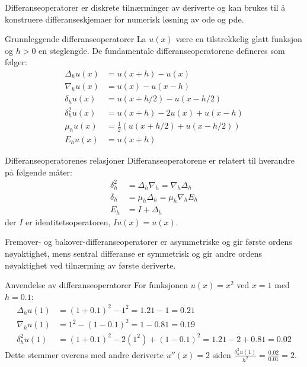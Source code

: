 Differanseoperatorer er diskrete tilnærminger av deriverte og kan brukes til å konstruere differanseskjemaer for numerisk løsning av \gls{ode} og \gls{pde}.

\begin{definition}{Grunnleggende differanseoperatorer}{}
  La $u(x)$ være en tilstrekkelig glatt funksjon og $h > 0$ en steglengde. De fundamentale differanseoperatorene defineres som følger:
  \begin{align}
    \Delta_h u(x)   & = u(x + h) - u(x) \tag{Fremover differanse} \label{eq:forward_diff}                                \\
    \nabla_h u(x)   & = u(x) - u(x - h) \tag{Bakover differanse} \label{eq:backward_diff}                                \\
    \delta_h u(x)   & = u(x + h/2) - u(x - h/2) \tag{Sentral differanse} \label{eq:central_diff}                         \\
    \delta_h^2 u(x) & = u(x + h) - 2u(x) + u(x - h) \tag{Andre ordens sentral differanse} \label{eq:second_central_diff} \\
    \mu_h u(x)      & = \frac{1}{2} \left( u(x + h/2) + u(x - h/2) \right) \tag{Gjennomsnittsoperator} \label{eq:avg_op} \\
    E_h u(x)        & = u(x + h) \tag{Skiftoperator} \label{eq:shift_op}
  \end{align}
\end{definition}

\begin{theorem}{Differanseoperatorenes relasjoner}{}
  Differanseoperatorene er relatert til hverandre på følgende måter:
  \begin{align}
    \delta_h^2 & = \Delta_h \nabla_h = \nabla_h \Delta_h \\
    \delta_h   & = \mu_h \Delta_h = \mu_h \nabla_h E_h   \\
    E_h        & = I + \Delta_h
  \end{align}
  der $I$ er identitetsoperatoren, $Iu(x) = u(x)$.
\end{theorem}

\begin{remark}
  Fremover- og bakover-differanseoperatorer er asymmetriske og gir første ordens nøyaktighet,
  mens sentral differanse er symmetrisk og gir andre ordens nøyaktighet ved tilnærming av første deriverte.
\end{remark}

\begin{example}{Anvendelse av differanseoperatorer}{}
  For funksjonen $u(x) = x^2$ ved $x=1$ med $h=0.1$:
  \begin{align*}
    \Delta_h u(1)   & = (1+0.1)^2 - 1^2 = 1.21 - 1 = 0.21                       \\
    \nabla_h u(1)   & = 1^2 - (1-0.1)^2 = 1 - 0.81 = 0.19                       \\
    \delta_h^2 u(1) & = (1+0.1)^2 - 2(1^2) + (1-0.1)^2 = 1.21 - 2 + 0.81 = 0.02
  \end{align*}
  Dette stemmer overens med andre deriverte $u''(x) = 2$ siden $\frac{\delta_h^2 u(1)}{h^2} = \frac{0.02}{0.01} = 2$.
\end{example}

